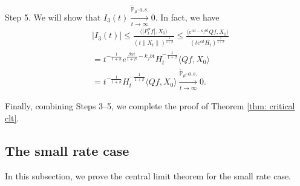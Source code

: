 \documentclass[12pt,a4paper]{amsart}
\theoremstyle{plain}
\theoremstyle{definition}
\numberwithin{equation}{section}
\begin{document}
	Step 5. 
    We will show that $I_3(t) \xrightarrow[t\to \infty]{\tilde {\mathbb P}_\mu \text{-} a.s.} 0$.
    In fact, we have
\begin{equation}\begin{split}
	&|I_3(t)|
\leq \frac{\langle |P^\alpha_tf|,X_0\rangle}{(t\|X_t\|)^{\frac{1}{1+\beta}}}
	\leq \frac{\langle e^{\alpha t - \kappa_f b t}Qf,X_0\rangle}{(te^{\alpha t} H_t)^{\frac{1}{1+\beta}}}
	\\& = t^{-\frac{1}{1+\beta}} e^{\frac{\beta \alpha t}{1+\beta} - k_fbt} H_t^{-\frac{1}{1+\beta}} \langle Qf,X_0\rangle
	\\& = t^{-\frac{1}{1+\beta}} H_t^{-\frac{1}{1+\beta}} \langle Qf,X_0\rangle
	\xrightarrow[t\to \infty]{\tilde {\mathbb P}_\mu \text{-} a.s.} 0.
\end{split}\end{equation}

	Finally, combining Steps 3--5, we complete the proof of Theorem \ref{thm: critical clt}.

\subsection{The small rate case}

    In this subsection, we prove the central limit theorem for the small rate case.
\end{document}
